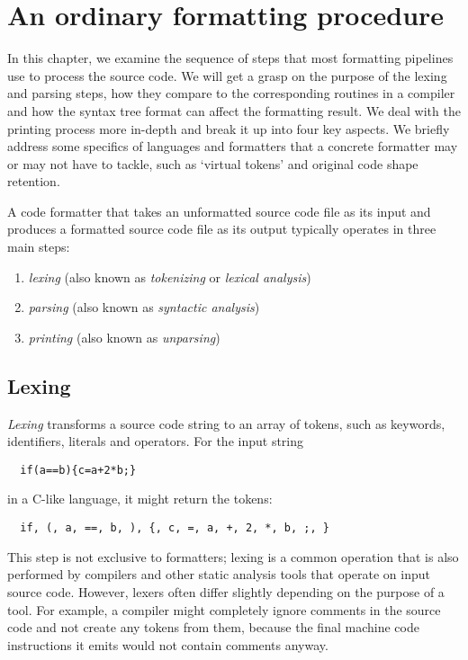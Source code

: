 \chapter{An ordinary formatting procedure}\label{chap:ordinary}
In this chapter, we examine the sequence of steps
that most formatting pipelines use to process the source code.
We will get a grasp on the purpose of the lexing and parsing steps,
how they compare to the corresponding routines in a compiler and
how the syntax tree format can affect the formatting result.
We deal with the printing process more in-depth and
break it up into four key aspects.
We briefly address some specifics of languages and formatters
that a concrete formatter may or may not have to tackle,
such as `virtual tokens' and original code shape retention.

A code formatter that takes an unformatted source code file as its input and
produces a formatted source code file as its output typically operates in three main steps:
\autocite{parsingBroadSense}\autocite{parsingAndReflectivePrinting}
\begin{enumerate}
  \item \textit{lexing} (also known as \textit{tokenizing} or \textit{lexical analysis})
  \item \textit{parsing} (also known as \textit{syntactic analysis})
  \item \textit{printing} (also known as \textit{unparsing}\autocite{prettyprinting})
\end{enumerate}

\section{Lexing}
\textit{Lexing} transforms a source code string to an array of tokens,
such as keywords, identifiers, literals and operators.
For the input string
\begin{verbatim}
  if(a==b){c=a+2*b;}
\end{verbatim}
in a C-like language, it might return the tokens:
\begin{verbatim}
  if, (, a, ==, b, ), {, c, =, a, +, 2, *, b, ;, }
\end{verbatim}

This step is not exclusive to formatters; lexing is a common operation that is also performed by
compilers and other static analysis tools that operate on input source code.
However, lexers often differ slightly depending on the purpose of a tool.
For example, a compiler might completely ignore comments in the source code and
not create any tokens from them, because the final machine code instructions it emits
would not contain comments anyway.

